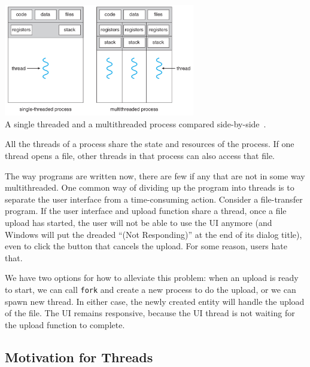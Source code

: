 \begin{center}
	\includegraphics[width=0.625\textwidth]{images/mthread2.png}\\
	A single threaded and a multithreaded process compared side-by-side~\cite{osc}.
\end{center}

All the threads of a process share the state and resources of the process. If one thread opens a file, other threads in that process can also access that file.

The way programs are written now, there are few if any that are not in some way multithreaded. One common way of dividing up the program into threads is to separate the user interface from a time-consuming action. Consider a file-transfer program. If the user interface and upload function share a thread, once a file upload has started, the user will not be able to use the UI anymore (and Windows will put the dreaded ``(Not Responding)'' at the end of its dialog title), even to click the button that cancels the upload. For some reason, users hate that. 

We have two options for how to alleviate this problem: when an upload is ready to start, we can call \texttt{fork} and create a new process to do the upload, or we can spawn  new thread. In either case, the newly created entity will handle the upload of the file. The UI remains responsive, because the UI thread is not waiting for the upload function to complete.

\subsection*{Motivation for Threads}

